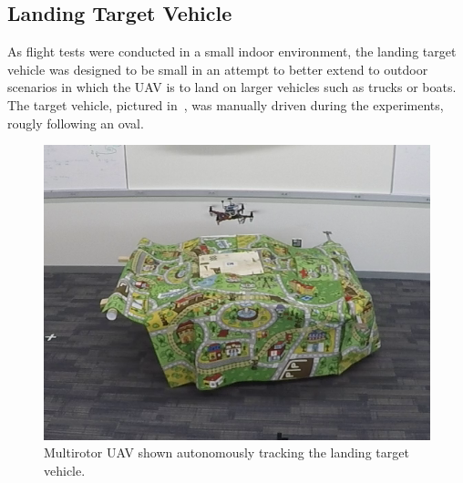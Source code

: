 
\subsection{Landing Target Vehicle}
As flight tests were conducted in a small indoor environment,
the landing target
vehicle was designed to be small in an attempt to better extend to outdoor
scenarios in which the UAV is to land on larger vehicles such as trucks or boats.
The target vehicle, pictured in~, was manually
driven during the experiments,
rougly following an oval.

\begin{figure}
  \centering
  \includegraphics[scale=0.5]{imgs/landing_vehicle.png}
  \caption[UAV Tracking the Target Vehicle During Flight Experiment]{Multirotor
    UAV shown autonomously tracking the landing target
  vehicle.}
  \label{fig:landing_vehicle}
\end{figure}
